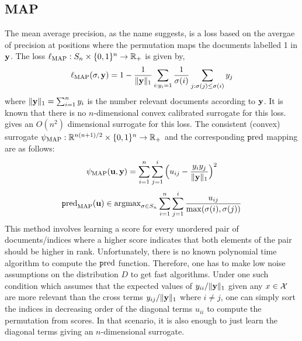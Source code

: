 \subsection{MAP}
The mean average precision, as the name suggests, is a loss based on the avergae of precision at positions where the permutation maps the documents labelled 1 in ${\mathbf y}$. The loss $\ell_{\text{MAP}}:S_n \times \{0,1\}^n \to {\mathbb R}_+$ is given by,
$$\ell_{\text{MAP}}(\sigma,{\mathbf y}) = 1 - \frac{1}{\lVert{\mathbf y}\rVert_1}\sum_{i:y_i = 1}\frac{1}{\sigma(i)}\sum_{j:\sigma(j) \leq \sigma(i)}y_j$$
where $\lVert{\mathbf y}\rVert_1 = \sum_{i=1}^ny_i$ is the number relevant documents according to ${\mathbf y}$. It is known that there is no $n$-dimensional convex calibrated surrogate for this loss. \cite{ramaswamy2013convex} gives an $O(n^2)$ dimensional surrogate for this loss. The consistent (convex) surrogate $\psi_{\text{MAP}}:  {\mathbb R}^{n(n+1)/2} \times \{0,1\}^n \to {\mathbb R}_+$ and the corresponding $\text{\texttt pred}$ mapping are as follows:
$$\psi_{\text{MAP}}({\mathbf u},{\mathbf y}) = \sum_{i=1}^n\sum_{j=1}^i\Big(u_{ij} - \frac{y_iy_j}{\lVert{\mathbf y}\rVert_1}\Big)^2$$
$$\text{\texttt pred}_{\text{MAP}}({\mathbf u}) \in \textup{\textrm{argmax}}_{\sigma\in S_n}\sum_{i=1}^n\sum_{j=1}^i \frac{u_{ij}}{\max(\sigma(i),\sigma(j))}$$
This method involves learning a score for every unordered pair of documents/indices where a higher score indicates that both elements of the pair should be higher in rank. Unfortunately, there is no known polynomial time algorithm to compute the $\text{\texttt pred}$ function. Therefore, one has to make low noise assumptions on the distribution $D$ to get fast algorithms. Under one such condition which assumes that the expected values of $y_{ii}/\lVert{\mathbf y}\rVert_1$ given any $x \in {\mathcal X}$ are more relevant than the cross terms $y_{ij}/\lVert{\mathbf y}\rVert_1$ where $i \neq j$, one can simply sort the indices in decreasing order of the diagonal terms $u_{ii}$ to compute the permutation from scores. In that scenario, it is also enough to just learn the diagonal terms giving an $n$-dimensional surrogate.  